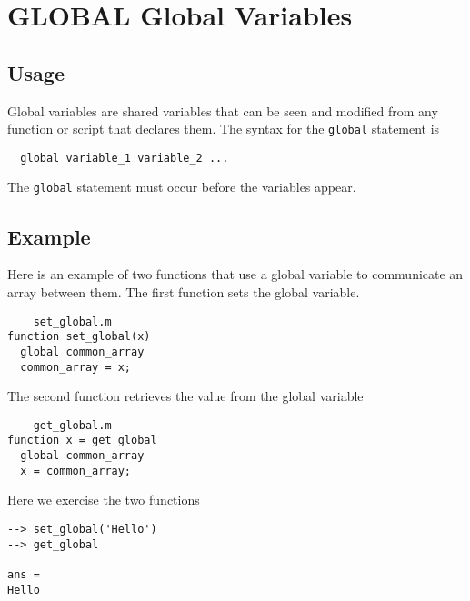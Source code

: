 \section{GLOBAL Global Variables}

\subsection{Usage}

Global variables are shared variables that can be
seen and modified from any function or script that
declares them.  The syntax for the \verb|global| statement
is
\begin{verbatim}
  global variable_1 variable_2 ...
\end{verbatim}
The \verb|global| statement must occur before the variables
appear.
\subsection{Example}

Here is an example of two functions that use a global
variable to communicate an array between them.  The
first function sets the global variable.
\begin{verbatim}
    set_global.m
function set_global(x)
  global common_array
  common_array = x;
\end{verbatim}
The second function retrieves the value from the global
variable
\begin{verbatim}
    get_global.m
function x = get_global
  global common_array
  x = common_array;
\end{verbatim}
Here we exercise the two functions
\begin{verbatim}
--> set_global('Hello')
--> get_global

ans = 
Hello
\end{verbatim}
